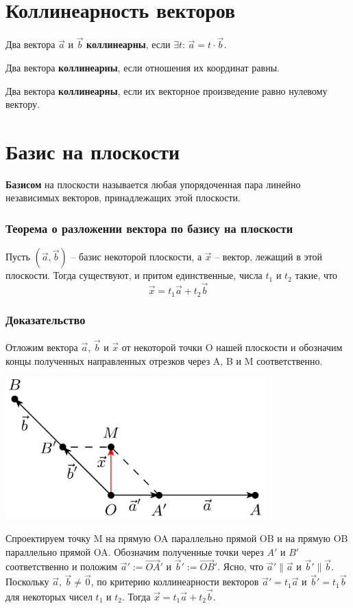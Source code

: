 \documentclass[a4paper]{article}
\begin{document}
{\begin{small}
\section*{Коллинеарность векторов}
Два вектора $\vec{a}$ и $\vec{b}$ \textbf{коллинеарны}, если $\exists t$: $\vec{a} = t \cdot \vec{b}$.

Два вектора \textbf{коллинеарны}, если отношения их координат равны.

Два вектора \textbf{коллинеарны}, если их векторное произведение равно нулевому вектору.

\section*{Базис на плоскости}
\textbf{Базисом} на плоскости называется любая упорядоченная пара линейно независимых векторов, принадлежащих этой плоскости. 

\subsubsection*{Теорема о разложении вектора по базису на плоскости}

Пусть $(\vec{a},\vec{b})$ – базис некоторой плоскости, а $\vec{x}$ – вектор, лежащий в этой
плоскости. Тогда существуют, и притом единственные, числа $t_1$ и $t_2$ такие,
что
\begin{equation}
\vec{x} = t_1 \vec{a} + t_2 \vec{b}
\end{equation}

\subsubsection*{Доказательство}
Отложим вектора $\vec{a}$, $\vec{b}$ и $\vec{x}$ от некоторой точки O нашей
плоскости и обозначим концы полученных направленных отрезков через A, B и M соответственно.

\includegraphics[width=10cm]{t1}

Спроектируем точку M на прямую OA параллельно прямой OB и на прямую OB параллельно прямой OA. Обозначим полученные точки через $A'$ и $B'$ соответственно и положим  $\vec{a}' := \overrightarrow{OA}'$ и $\vec{b}' := \overrightarrow{OB}'$. Ясно, что $\vec{a}' \parallel \vec{a}$ и $\vec{b}' \parallel \vec{b}$. Поскольку $\vec{a}$, $\vec{b} \neq \vec{0}$, по критерию коллинеарности векторов $\vec{a}' = t_1 \vec{a}$ и $\vec{b}' = t_1 \vec{b}$ для некоторых чисел $t_1$ и $t_2$.
Тогда $\vec{x} = t_1 \vec{a} + t_2 \vec{b}$.


\end{small}}
\end{document}

